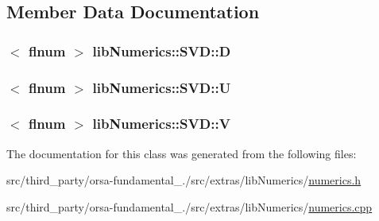 \subsection{Member Data Documentation}
\hypertarget{classlibNumerics_1_1SVD_a3617939e2eba979cdd7913029d7200d3}{}
\subsubsection[{D}]{$<$ {\bf flnum} $>$ lib\+Numerics\+::\+S\+V\+D\+::\+D}\label{classlibNumerics_1_1SVD_a3617939e2eba979cdd7913029d7200d3}
\hypertarget{classlibNumerics_1_1SVD_a123cf47ae549129588deccd62c725e24}{}
\subsubsection[{U}]{$<$ {\bf flnum} $>$ lib\+Numerics\+::\+S\+V\+D\+::\+U}\label{classlibNumerics_1_1SVD_a123cf47ae549129588deccd62c725e24}
\hypertarget{classlibNumerics_1_1SVD_a21d943de3bbc8754a2e9ea41795a6d96}{}
\subsubsection[{V}]{$<$ {\bf flnum} $>$ lib\+Numerics\+::\+S\+V\+D\+::\+V}\label{classlibNumerics_1_1SVD_a21d943de3bbc8754a2e9ea41795a6d96}


The documentation for this class was generated from the following files\+:\begin{DoxyCompactItemize}
\item 
src/third\+\_\+party/orsa-\/fundamental\+\_./src/extras/lib\+Numerics/\hyperlink{extras_2libNumerics_2numerics_8h}{numerics.\+h}\item 
src/third\+\_\+party/orsa-\/fundamental\+\_./src/extras/lib\+Numerics/\hyperlink{extras_2libNumerics_2numerics_8cpp}{numerics.\+cpp}\end{DoxyCompactItemize}
